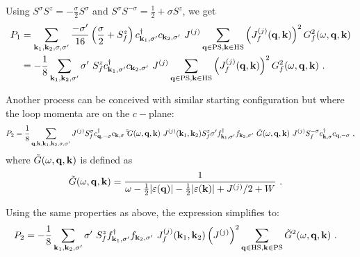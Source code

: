 \documentclass[%
reprint,
superscriptaddress,
groupedaddress,
superscriptaddress,
onecolumn,
]{revtex4-2}
\begin{document}
Using \(S^\sigma S^z = -\frac{\sigma}{2}S^\sigma\) and \(S^\sigma S^{-\sigma} = \frac{1}{2} + \sigma S^z\), we get
\begin{equation}\begin{aligned}
	P_1 &= \sum_{{\bf k}_1, {\bf k}_2,\sigma,\sigma^\prime} \frac{-\sigma^\prime}{16} \left(\frac{\sigma}{2} + S_f^z\right) c^\dagger_{{\bf k}_1,\sigma^\prime}c_{{\bf k}_2,\sigma^\prime} ~  J^{(j)} \sum_{{\bf q} \in \text{PS} ,{\bf k} \in \text{HS}}\left(J_f^{(j)}({\bf q},{\bf k})\right)^2 G^2_f(\omega, {\bf q}, {\bf k})\\
		&= -\frac{1}{8}\sum_{{\bf k}_1, {\bf k}_2,\sigma^\prime} \sigma^\prime~S_f^z c^\dagger_{{\bf k}_1,\sigma^\prime}c_{{\bf k}_2,\sigma^\prime} ~  J^{(j)} \sum_{{\bf q} \in \text{PS} ,{\bf k} \in \text{HS}}\left(J_f^{(j)}({\bf q},{\bf k})\right)^2 G^2_f(\omega, {\bf q}, {\bf k})~.
\end{aligned}\end{equation}

Another process can be conceived with similar starting configuration but where the loop momenta are on the \(c-\)plane:
\begin{equation}\begin{aligned}
	P_2 = \frac{1}{8}\sum_{{\bf q},{\bf k},{\bf k}_1, {\bf k}_2,\sigma,\sigma^\prime} J^{(j)} S_f^\sigma c^\dagger_{{\bf q},-\sigma}c_{{\bf k},\sigma} ~ \tilde \tilde G(\omega, {\bf q}, {\bf k}) ~ J^{(j)}({\bf k}_1,{\bf k}_2) S_f^z \sigma^\prime f^\dagger_{{\bf k}_1,\sigma^\prime}f_{{\bf k}_2,\sigma^\prime} ~ \tilde G(\omega, {\bf q}, {\bf k}) ~ J^{(j)} S_f^{-\sigma} c^\dagger_{{\bf k},\sigma}c_{{\bf q},-\sigma}~,
\end{aligned}\end{equation}
where \(\tilde G(\omega,{\bf q}, {\bf k})\) is defined as
\begin{equation}\begin{aligned}
	\tilde G(\omega,{\bf q}, {\bf k}) &= \frac{1}{\omega - \frac{1}{2}|\varepsilon({\bf q})| - \frac{1}{2}|\varepsilon({\bf k})| + J^{(j)}/2 + W}~.
\end{aligned}\end{equation}


Using the same properties as above, the expression simplifies to:
\begin{equation}\begin{aligned}
	P_2 &= -\frac{1}{8}\sum_{{\bf k}_1, {\bf k}_2,\sigma^\prime} \sigma^\prime~S_f^z f^\dagger_{{\bf k}_1,\sigma^\prime}f_{{\bf k}_2,\sigma^\prime} ~  J_f^{(j)}({\bf k}_1,{\bf k}_2) \left(J^{(j)}\right)^2 \sum_{{\bf q} \in \text{HS} ,{\bf k} \in \text{PS}}\tilde G^2(\omega,{\bf q}, {\bf k})~.
\end{aligned}\end{equation}
\end{document}
